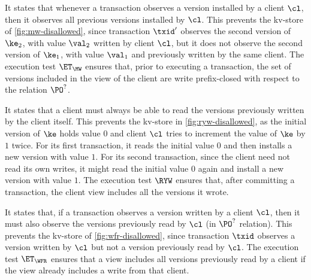 It states that whenever a transaction observes a version installed by a client $\cl$,
then it observes all previous versions installed by $\cl$. 
This prevents \eg the kv-store of \cref{fig:mw-disallowed}, since 
transaction $\txid'$ observes the second version of $\ke_2$, 
with value $\val_2$ written by client $\cl$, 
but it does not observe the second version of $\ke_1$, 
with value $\val_1$ and previously written by the same client.
The execution test $\ET_{\MW}$  ensures that, prior to executing a transaction,
the set of versions included in the view of the client are write 
prefix-closed with respect to the relation $\PO^?$.



It states that a client must always be able to read the versions previously written by the client itself.
This prevents the kv-store in \cref{fig:ryw-disallowed}, 
as the initial version of $\ke$ holds value $0$ 
and client $\cl$ tries to increment the value of $\ke$ by $1$ twice.  
For its first transaction, it reads the initial value $0$ and then installs  a new version with value $1$. 
For its second transaction, since the client need not read its own writes, 
it might read the initial value $0$ again and install a new version with value $1$.
The execution test $\RYW$ ensures that, after committing a transaction, 
the client view includes all the versions it wrote.  

It states that, if a transaction observes a version written by a
client $\cl$, then it must also observe the versions previously read by $\cl$ (in $\PO^?$ relation).
This prevents the kv-store of \cref{fig:wfr-disallowed},
since transaction $\txid$ observes a version written by $\cl$ but
not a version previously read by $\cl$.
The execution test $\ET_{\WFR}$  ensures
that a view includes all versions previously read by a client 
if the view already includes a write from that client. 

